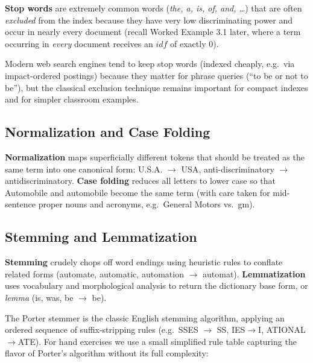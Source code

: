 \documentclass[11pt, a4paper]{article}
\begin{document}
\begin{defbox}
\textbf{Stop words} are extremely common words (\emph{the, a, is, of, and, \ldots}) that are often \emph{excluded} from the index because they have very low discriminating power and occur in nearly every document (recall Worked Example 3.1 later, where a term occurring in \emph{every} document receives an $idf$ of exactly $0$).
\end{defbox}

Modern web search engines tend to keep stop words (indexed cheaply, e.g.\ via impact-ordered postings) because they matter for phrase queries (``to be or not to be''), but the classical exclusion technique remains important for compact indexes and for simpler classroom examples.

\subsection{Normalization and Case Folding}

\textbf{Normalization} maps superficially different tokens that should be treated as the same term into one canonical form: \textsf{U.S.A.} $\to$ \textsf{USA}, \textsf{anti-discriminatory} $\to$ \textsf{antidiscriminatory}. \textbf{Case folding} reduces all letters to lower case so that \textsf{Automobile} and \textsf{automobile} become the same term (with care taken for mid-sentence proper nouns and acronyms, e.g.\ \textsf{General Motors} vs.\ \textsf{gm}).

\subsection{Stemming and Lemmatization}
\label{sec:stemming}

\begin{defbox}
\textbf{Stemming} crudely chops off word endings using heuristic rules to conflate related forms (\textsf{automate}, \textsf{automatic}, \textsf{automation} $\to$ \textsf{automat}). \textbf{Lemmatization} uses vocabulary and morphological analysis to return the dictionary base form, or \emph{lemma} (\textsf{is}, \textsf{was}, \textsf{be} $\to$ \textsf{be}).
\end{defbox}

The Porter stemmer is the classic English stemming algorithm, applying an ordered sequence of suffix-stripping rules (e.g.\ \textsf{SSES} $\to$ \textsf{SS}, \textsf{IES}$\to$\textsf{I}, \textsf{ATIONAL}$\to$\textsf{ATE}). For hand exercises we use a small simplified rule table capturing the flavor of Porter's algorithm without its full complexity:
\end{document}
